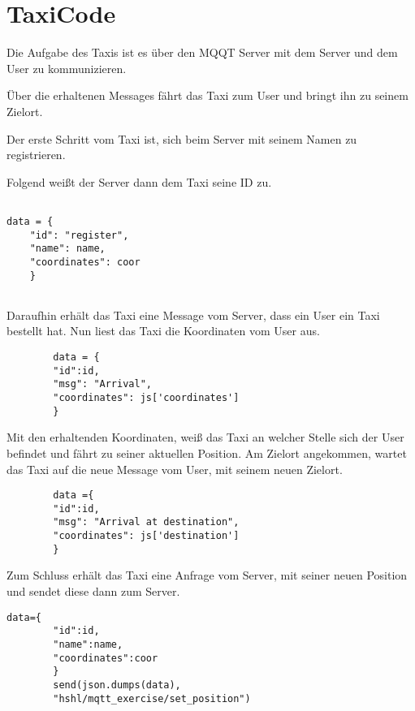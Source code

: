 \section{TaxiCode}

Die Aufgabe des Taxis ist es über den MQQT Server mit dem Server und dem User zu kommunizieren.
 
Über die erhaltenen Messages fährt das Taxi zum User und bringt ihn zu seinem Zielort.

Der erste Schritt vom Taxi ist, sich beim Server mit seinem Namen zu registrieren. 

Folgend weißt der Server dann dem Taxi seine ID zu.

\begin{lstlisting} 

data = {
	"id": "register", 
	"name": name,
	"coordinates": coor
    }
    
\end{lstlisting}



Daraufhin erhält das Taxi eine Message vom Server, dass ein User ein Taxi bestellt hat. 
Nun liest das Taxi die Koordinaten vom User aus. 

\begin{lstlisting} 
        data = {
        "id":id,
        "msg": "Arrival",
        "coordinates": js['coordinates']
        }
\end{lstlisting}



Mit den erhaltenden Koordinaten, weiß das Taxi an welcher Stelle sich der User befindet und fährt zu seiner aktuellen Position.
Am Zielort angekommen, wartet das Taxi auf die neue Message vom User, mit seinem neuen Zielort.


\begin{lstlisting} 
        data ={
        "id":id,
        "msg": "Arrival at destination",
        "coordinates": js['destination']
        }
\end{lstlisting}



Zum Schluss erhält das Taxi eine Anfrage vom Server, mit seiner neuen Position und sendet diese dann zum Server.

\begin{lstlisting} 
data={
        "id":id,
        "name":name,
        "coordinates":coor
        }
        send(json.dumps(data),
        "hshl/mqtt_exercise/set_position")

\end{lstlisting}
